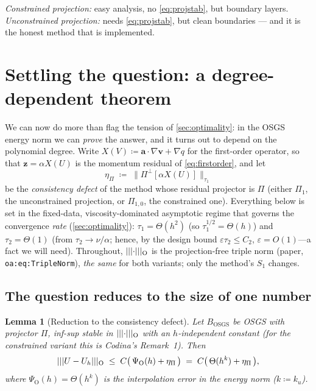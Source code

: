 \documentclass[11pt]{article}
\newcommand{\bv}{\boldsymbol{v}}
\newcommand{\ba}{\boldsymbol{a}}
\newcommand{\bz}{\boldsymbol{z}}
\newcommand{\grad}{\nabla}
\newcommand{\Pone}{\Pi_{1}}
\newcommand{\Ponez}{\Pi_{1,0}}
\newcommand{\normtau}[1]{\lVert #1 \rVert_{\tau_{1}}}
\DeclarePairedDelimiter\vvvert{\lvert\lvert\lvert}{\rvert\rvert\rvert}
\newcommand{\tnorm}[1]{\vvvert{#1}}
\theoremstyle{plain}
\newtheorem{lemma}{Lemma}
\theoremstyle{definition}
\theoremstyle{remark}
\begin{document}
\begin{center}
\emph{Constrained projection:} easy analysis, no \cref{eq:projstab},
but boundary layers. \\
\emph{Unconstrained projection:} needs \cref{eq:projstab}, but clean
boundaries --- and it is the honest method that is implemented.
\end{center}

\section{Settling the question: a degree-dependent theorem}
\label{sec:settle}

We can now do more than flag the tension of \cref{sec:optimality}: in the
OSGS energy norm we can \emph{prove} the answer, and it turns out to depend
on the polynomial degree. Write $X(V)\coloneqq\ba\cdot\grad\bv+\grad q$ for
the first-order operator, so that $\bz=\alpha X(U)$ is the momentum
residual of \cref{eq:firstorder}, and let
\begin{equation}\label{eq:st:defect}
  \eta_\Pi \;\coloneqq\; \normtau{\Pi^{\perp}[\alpha X(U)]}
\end{equation}
be the \emph{consistency defect} of the method whose residual projector is
$\Pi$ (either $\Pone$, the unconstrained projection, or $\Ponez$, the
constrained one). Everything below is set in the fixed-data,
viscosity-dominated asymptotic regime that governs the convergence
\emph{rate} (\cref{sec:optimality}): $\tau_1=\Theta(h^2)$ (so
$\tau_1^{1/2}=\Theta(h)$) and $\tau_2=\Theta(1)$ (from
$\tau_2\to\nu/\alpha$; hence, by the design bound $\varepsilon\tau_2\le C_2$,
$\varepsilon=O(1)$---a fact we will need). Throughout, $\tnorm{\cdot}_{\mathrm{O}}$
is the projection-free triple norm (paper, \texttt{oa:eq:TripleNorm}),
\emph{the same} for both variants; only the method's $S_1$ changes.

\subsection{The question reduces to the size of one number}

\begin{lemma}[Reduction to the consistency defect]\label{lem:st:reduce}
Let $B_{\mathrm{OSGS}}$ be OSGS with projector $\Pi$, inf-sup stable in
$\tnorm{\cdot}_{\mathrm{O}}$ with an $h$-independent constant (for the
constrained variant this is Codina's Remark~1). Then
\begin{equation}\label{eq:st:reduce}
  \tnorm{U-U_h}_{\mathrm{O}}\;\le\;C\bigl(\,\Psi_{\mathrm{O}}(h)+\eta_\Pi\,\bigr)
  \;=\;C\bigl(\,\Theta(h^{k})+\eta_\Pi\,\bigr),
\end{equation}
where $\Psi_{\mathrm{O}}(h)=\Theta(h^{k})$ is the interpolation error in the
energy norm ($k\coloneqq k_u$).
\end{lemma}
\end{document}

